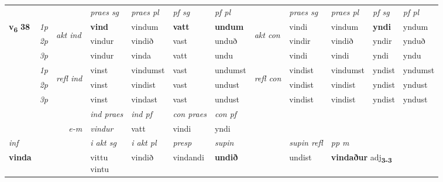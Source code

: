 \begin{longtable}[l]{X>{\footnotesize\itshape}llXXXXlXXXX}
 & &   & \textit{praes sg}  & \textit{praes pl}    & \textit{ pf sg} & \textit{pf pl} & & \textit{praes sg}  & \textit{praes pl}    & \textit{pf sg} & \textit{pf pl }  \\ \cmidrule{4-7} \cmidrule{9-12}
 \multirow{2}{*}{{{\textbf{v{\textsubscript{6}}} \Large{\textbf{38}}}}}  & 1p & \multirow{3}{*}{\begin{turn}{90}\textit{akt ind}\end{turn}} & \textbf{vind} & vindum & \textbf{vatt} & \textbf{undum} & \multirow{3}{*}{\begin{turn}{90}\textit{akt con}\end{turn}} &vindi & vindum & \textbf{yndi} & yndum\\*
 & 2p &  &  vindur  & vindið & vast & unduð & & vindir & vindið & yndir & ynduð \\*
 & 3p &  & vindur & vinda & vatt & undu & & vindi & vindi& yndi & yndu \\*
\cmidrule{4-7} \cmidrule{9-12}
 & 1p & \multirow{3}{*}{\begin{turn}{90}\textit{refl ind}\end{turn}}  & vinst & vindumst & vast & undumst & \multirow{3}{*}{\begin{turn}{90}\textit{refl con}\end{turn}}  &vindist & vindumst & yndist & yndumst \\*
 & 2p &  & vinst & vindist & vast & undust & &vindist & vindist & yndist & yndust \\*
 & 3p  & & vinst & vindast & vast & undust & & vindist & vindist& yndist & yndust \\*
\cmidrule{4-7} \cmidrule{9-12}

   && &  \textit{ind praes} & \textit{ind pf} & \textit{con praes} & \textit{con pf} \\*
\multicolumn{3}{r}{\textit{e-m}} & vindur & vatt & vindi & yndi \\*

\cmidrule{4-7}
   {\textit{inf}} & &  & \textit{i akt sg} & \textit{i akt pl}   & \textit{presp} & \textit{supin} && \textit{supin refl} & \textit{pp m} \\*
  {\textbf{vinda}} & && \specialcell{vittu\\ vintu}  & vindið   & vindandi &  \textbf{undið} && undist & \multicolumn{2}{l}{\textbf{vindaður} adj\textbf{\textsubscript{3-3}}} \\*

\midrule


\end{longtable}
